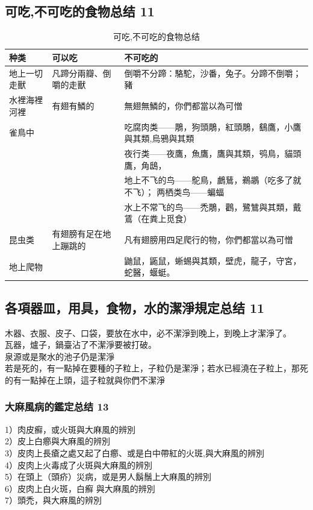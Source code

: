 \subsection{可吃,不可吃的食物总结 11}
\begin{table}[h]%
\vspace*{-\baselineskip}
\begin{tabular}{ll l}
\hline
\hline
种类 &可以吃& 不可吃的 \\\hline
地上一切走獸 &凡蹄分兩瓣、倒嚼的走獸 & 倒嚼不分蹄：駱駝，沙番，兔子。分蹄不倒嚼；豬 \\\hline
水裡海裡河裡&有翅有鱗的&無翅無鱗的，你們都當以為可憎 \\\hline
雀鳥中& &吃腐肉类——鵰，狗頭鵰，紅頭鵰，鷂鷹，小鷹與其類,烏鴉與其類   \\
& &夜行类——夜鷹，魚鷹，鷹與其類，鸮鳥，貓頭鷹，角鴟，  \\
& &地上不飞的鸟——鴕鳥，鸕鶿，鵜鶘（吃多了就不飞）；  两栖类鸟——蝙蝠 \\
& &水上不常飞的鸟——禿鵰，鸛，鷺鷥與其類，戴鵀（在粪上觅食）  \\\hline
昆虫类 &有翅膀有足在地上蹦跳的&凡有翅膀用四足爬行的物，你們都當以為可憎   \\\hline
 地上爬物&&鼬鼠，鼫鼠，蜥蜴與其類，壁虎，龍子，守宮，蛇醫，蝘蜓。 \\\hline
\end{tabular}
\caption{可吃,不可吃的食物总结}
\end{table}



\subsection{各項器皿，用具，食物，水的潔淨規定总结 11}
木器、衣服、皮子、口袋，要放在水中，必不潔淨到晚上，到晚上才潔淨了。\\
瓦器，爐子，鍋臺沾了不潔淨要被打破。\\
泉源或是聚水的池子仍是潔淨\\
若是死的，有一點掉在要種的子粒上，子粒仍是潔淨；若水已經澆在子粒上，那死的有一點掉在上頭，這子粒就與你們不潔淨

\subsubsection{大麻風病的鑑定总结 13}
 1）肉皮癬，或火斑與大麻風的辨別\\
 2）皮上白癤與大麻風的辨別\\
 3）皮肉上長瘡之處又起了白癤、或是白中帶紅的火斑,與大麻風的辨別\\
 4）皮肉上火毒成了火斑與大麻風的辨別\\
 5）在頭上（頭疥）災病，或是男人鬍鬚上大麻風的辨別\\
 6）皮肉上白火斑，白癬  與大麻風的辨別\\
 7）頭禿，與大麻風的辨別





















